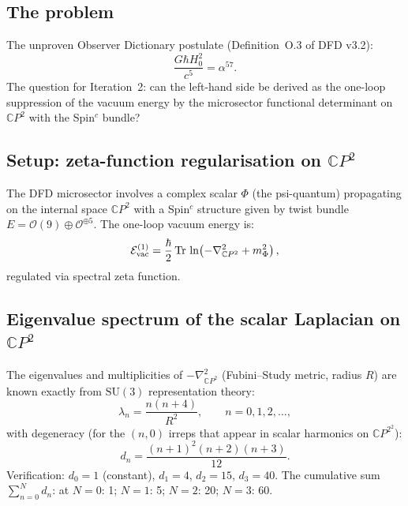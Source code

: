 \documentclass[11pt]{article}
\newcommand{\CP}{\mathbb{C}P^2}
\newcommand{\Hzero}{H_0}
\newcommand{\alphafine}{\alpha}
\begin{document}
\subsection{The problem}

The unproven Observer Dictionary postulate (Definition~O.3 of DFD v3.2):
\begin{equation}\label{eq:dict-postulate}
  \frac{G\hbar \Hzero^2}{c^5} = \alphafine^{57}.
\end{equation}
The question for Iteration~2: can the left-hand side be derived as the
one-loop suppression of the vacuum energy by the microsector functional
determinant on $\CP$ with the Spin$^c$ bundle?

\subsection{Setup: zeta-function regularisation on $\mathbb{C}P^2$}

The DFD microsector involves a complex scalar $\Phi$ (the psi-quantum)
propagating on the internal space $\CP$ with a Spin$^c$ structure given
by twist bundle $E = \mathcal{O}(9) \oplus \mathcal{O}^{\oplus 5}$.
The one-loop vacuum energy is:
\begin{equation}
  \mathcal{E}_{\rm vac}^{(1)} = \frac{\hbar}{2}\,{\rm Tr}\,\ln
  \!\left(-\nabla^2_{\CP} + m_\Phi^2\right),
\end{equation}
regulated via spectral zeta function.

\subsection{Eigenvalue spectrum of the scalar Laplacian on $\mathbb{C}P^2$}

The eigenvalues and multiplicities of $-\nabla^2_{\CP}$ (Fubini--Study
metric, radius $R$) are known exactly from $\mathrm{SU}(3)$ representation
theory:
\begin{equation}\label{eq:eigenvalues}
  \lambda_n = \frac{n(n+4)}{R^2}, \qquad n = 0,1,2,\ldots,
\end{equation}
with degeneracy (for the $(n,0)$ irreps that appear in scalar harmonics
on $\CP^2$):
\begin{equation}\label{eq:degeneracy}
  d_n = \frac{(n+1)^2(n+2)(n+3)}{12}.
\end{equation}
Verification: $d_0 = 1$ (constant), $d_1 = 4$, $d_2 = 15$, $d_3 = 40$.
The cumulative sum $\sum_{n=0}^{N} d_n$: at $N = 0$: 1; $N = 1$: 5;
$N = 2$: 20; $N = 3$: 60.
\end{document}
